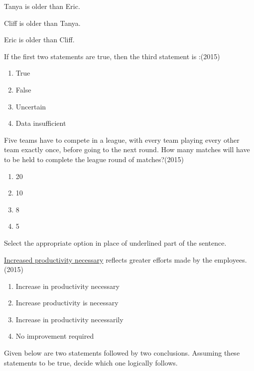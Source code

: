 \item Tanya is older than Eric.

Cliff is older than Tanya.

Eric is older than Cliff.

If the first two statements are true, then the third statement is :\hfill(2015)
\begin{multicols}{2}
\begin{enumerate}
\item True
\item False
\item Uncertain
\item Data insufficient
\end{enumerate}
\end{multicols}


\item Five teams have to compete in a league, with every team playing every other team exactly once, before going to the next round. How many matches will have to be held to complete the league round of matches?\hfill(2015)
\begin{multicols}{2}
\begin{enumerate}
\item 20
\item 10
\item 8
\item 5
\end{enumerate}
\end{multicols}


\item Select the appropriate option in place of underlined part of the sentence.

\underline{Increased productivity necessary} reflects greater efforts made by the employees.\hfill(2015)
\begin{multicols}{2}
\begin{enumerate}
\item Increase in productivity necessary
\item Increase productivity is necessary
\item Increase in productivity necessarily
\item No improvement required
\end{enumerate}
\end{multicols}


\item Given below are two statements followed by two conclusions. Assuming these statements to be true, decide which one logically follows.

